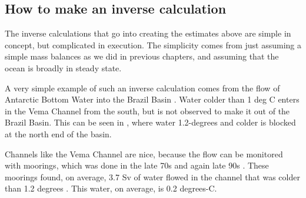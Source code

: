 \subsection{How to make an inverse calculation}

The inverse calculations that go into creating the estimates above are simple in concept, but complicated in execution.  The simplicity comes from just assuming a simple mass balances as we did in previous chapters, and assuming that the ocean is broadly in steady state.  

A very simple example of such an inverse calculation comes from the flow of Antarctic Bottom Water into the Brazil Basin . Water colder than 1 deg C enters in the Vema Channel from the south, but is not observed to make it out of the Brazil Basin.    This can be seen in , where water 1.2-degrees and colder is blocked at the north end of the basin.  

Channels like the Vema Channel are nice, because the flow can be  monitored with moorings, which was done in the late 70s \citep{hoggetal82} and again late 90s \citep{morrisetal01}.  These moorings found, on average, 3.7 Sv of water flowed in the channel that was colder than 1.2 degrees \citep{morrisetal01}.  This water, on average, is 0.2 degrees-C.  


